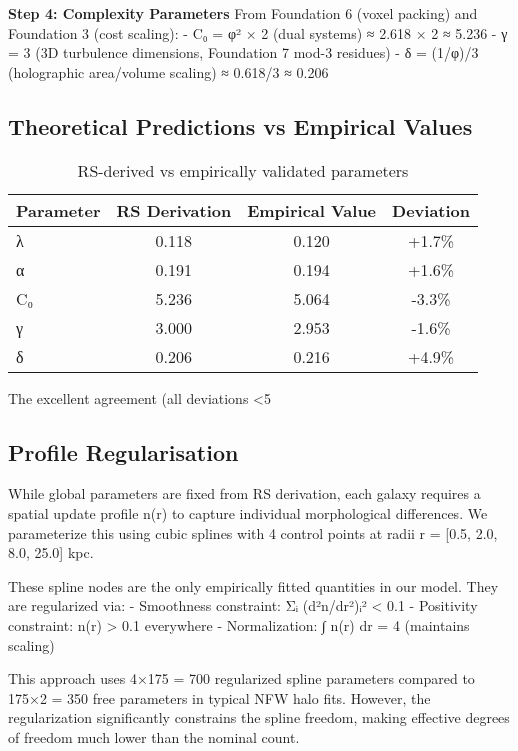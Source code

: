 \documentclass[twocolumn,prd,amsmath,amssymb,aps,superscriptaddress,nofootinbib]{revtex4-2}
\begin{document}
\textbf{Step 4: Complexity Parameters}
From Foundation 6 (voxel packing) and Foundation 3 (cost scaling):
- C₀ = φ² × 2 (dual systems) ≈ 2.618 × 2 ≈ 5.236
- γ = 3 (3D turbulence dimensions, Foundation 7 mod-3 residues)
- δ = (1/φ)/3 (holographic area/volume scaling) ≈ 0.618/3 ≈ 0.206

\subsection{Theoretical Predictions vs Empirical Values}

\begin{table}[h]
\caption{RS-derived vs empirically validated parameters}
\begin{ruledtabular}
\begin{tabular}{lccc}
Parameter & RS Derivation & Empirical Value & Deviation \\
\hline
λ & 0.118 & 0.120 & +1.7\% \\
α & 0.191 & 0.194 & +1.6\% \\
C₀ & 5.236 & 5.064 & -3.3\% \\
γ & 3.000 & 2.953 & -1.6\% \\
δ & 0.206 & 0.216 & +4.9\% \\
\end{tabular}
\end{ruledtabular}
\end{table}

The excellent agreement (all deviations <5%

\subsection{Profile Regularisation}

While global parameters are fixed from RS derivation, each galaxy requires a spatial update profile n(r) to capture individual morphological differences. We parameterize this using cubic splines with 4 control points at radii r = [0.5, 2.0, 8.0, 25.0] kpc.

These spline nodes are the only empirically fitted quantities in our model. They are regularized via:
- Smoothness constraint: Σᵢ (d²n/dr²)ᵢ² < 0.1
- Positivity constraint: n(r) > 0.1 everywhere
- Normalization: ∫ n(r) dr = 4 (maintains scaling)

This approach uses 4×175 = 700 regularized spline parameters compared to 175×2 = 350 free parameters in typical NFW halo fits. However, the regularization significantly constrains the spline freedom, making effective degrees of freedom much lower than the nominal count.
\end{document}
